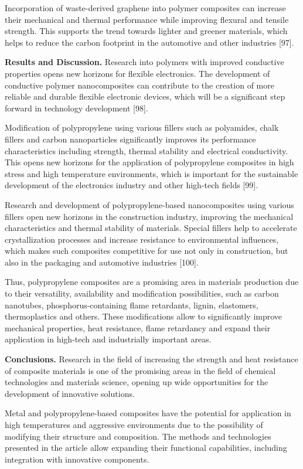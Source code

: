 \begin{multicols}{2}
Incorporation of waste-derived graphene into polymer composites can
increase their mechanical and thermal performance while improving
flexural and tensile strength. This supports the trend towards lighter
and greener materials, which helps to reduce the carbon footprint in the
automotive and other industries {[}97{]}.

{\bfseries Results and Discussion.} Research into polymers with improved
conductive properties opens new horizons for flexible electronics. The
development of conductive polymer nanocomposites can contribute to the
creation of more reliable and durable flexible electronic devices, which
will be a significant step forward in technology development {[}98{]}.

Modification of polypropylene using various fillers such as polyamides,
chalk fillers and carbon nanoparticles significantly improves its
performance characteristics including strength, thermal stability and
electrical conductivity. This opens new horizons for the application of
polypropylene composites in high stress and high temperature
environments, which is important for the sustainable development of the
electronics industry and other high-tech fields {[}99{]}.

Research and development of polypropylene-based nanocomposites using
various fillers open new horizons in the construction industry,
improving the mechanical characteristics and thermal stability of
materials. Special fillers help to accelerate crystallization processes
and increase resistance to environmental influences, which makes such
composites competitive for use not only in construction, but also in the
packaging and automotive industries {[}100{]}.

Thus, polypropylene composites are a promising area in materials
production due to their versatility, availability and modification
possibilities, such as carbon nanotubes, phosphorus-containing flame
retardants, lignin, elastomers, thermoplastics and others. These
modifications allow to significantly improve mechanical properties, heat
resistance, flame retardancy and expand their application in high-tech
and industrially important areas.

{\bfseries Conclusions.} Research in the field of increasing the strength
and heat resistance of composite materials is one of the promising areas
in the field of chemical technologies and materials science, opening up
wide opportunities for the development of innovative solutions.

Metal and polypropylene-based composites have the potential for
application in high temperatures and aggressive environments due to the
possibility of modifying their structure and composition. The methods
and technologies presented in the article allow expanding their
functional capabilities, including integration with innovative
components.


\end{multicols}
